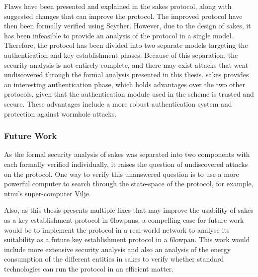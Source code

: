 Flaws have been presented and explained in the \gls{sakes} protocol, along with suggested changes that can improve the protocol. The improved protocol have then been formally verified using Scyther. However, due to the design of \gls{sakes}, it has been infeasible to provide an analysis of the protocol in a single model. Therefore, the protocol has been divided into two separate models targeting the authentication and key establishment phases. Because of this separation, the security analysis is not entirely complete, and there may exist attacks that went undiscovered through the formal analysis presented in this thesis. \gls{sakes} provides an interesting authentication phase, which holds advantages over the two other protocols, given that the authentication module used in the scheme is trusted and secure. These advantages include a more robust authentication system and protection against wormhole attacks.

\subsubsection{Future Work}

As the formal security analysis of \gls{sakes} was separated into two components with each formally verified individually, it raises the question of undiscovered attacks on the protocol. One way to verify this unanswered question is to use a more powerful computer to search through the state-space of the protocol, for example, \gls{ntnu}'s super-computer Vilje.  

Also, as this thesis presents multiple fixes that may improve the usability of \gls{sakes} as a key establishment protocol in \gls{6lowpan}s, a compelling case for future work would be to implement the protocol in a real-world network to analyse its suitability as a future key establishment protocol in a \gls{6lowpan}. This work would include more extensive security analysis and also an analysis of the energy consumption of the different entities in \gls{sakes} to verify whether standard technologies can run the protocol in an efficient matter.






%